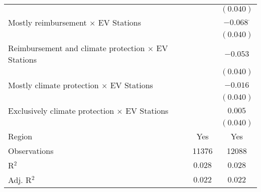 \begin{center}
\begin{tiny}
\begin{longtable}{l@{} c@{} c@{}}
                                                                                                       &                  & $(0.040)$        \\
\quad Mostly reimbursement $\times$ EV Stations                                                        &                  & $-0.068^{\cdot}$ \\
                                                                                                       &                  & $(0.040)$        \\
\quad Reimbursement and climate protection $\times$ EV Stations                                        &                  & $-0.053$         \\
                                                                                                       &                  & $(0.040)$        \\
\quad Mostly climate protection $\times$ EV Stations                                                   &                  & $-0.016$         \\
                                                                                                       &                  & $(0.040)$        \\
\quad Exclusively climate protection $\times$ EV Stations                                              &                  & $0.005$          \\
                                                                                                       &                  & $(0.040)$        \\
\hline
Region                                                                                                 & Yes              & Yes              \\
Observations                                                                                           & 11376            & 12088            \\
R$^2$                                                                                                  & $0.028$          & $0.028$          \\
Adj. R$^2$                                                                                             & $0.022$          & $0.022$          \\
\end{longtable}
\end{tiny}
\end{center}
